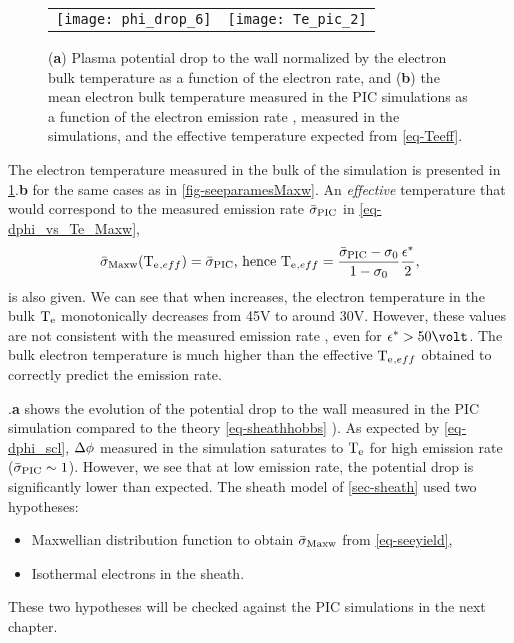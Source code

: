   \begin{figure}[hbt]
    \centering
    \begin{tabular}{@{} cc}
      \texttt{[image: phi\_drop\_6]}
      &
      \texttt{[image: Te\_pic\_2]}
    \end{tabular}
    \caption{({\bf a}) Plasma potential drop to the wall normalized by the electron bulk temperature as a function of the electron rate, and ({\bf b}) the mean electron bulk temperature measured in the \acs{PIC} simulations as a function of the electron emission rate \rate, measured in the simulations, and the effective temperature expected from \cref{eq-Teeff}.  }
    \label{fig-Tevsproba}
  \end{figure}
  
  The electron temperature measured in the bulk of the simulation is presented in \cref{fig-Tevsproba}.{\bf b} for the same cases as in \cref{fig-seeparamesMaxw}.
  An \emph{effective} temperature that would correspond to the measured emission rate $ \bar{\sigma }_{\rm PIC}$ in \cref{eq-dphi_vs_Te_Maxw},
  \begin{equation} \label{eq-Teeff}
      \bar{\sigma }_{\rm Maxw}(\mathrm{T_e}{}_{, eff}) =  \bar{\sigma }_{\rm PIC} \text{, hence } \mathrm{T_e}{}_{, eff} = \frac{ \bar{\sigma }_{\rm PIC} - \sigma_0}{1 - \sigma_0} \frac{\epsilon^{*}}{2},
  \end{equation}
  is also given.
  We can see that when \rate increases, the electron temperature in the bulk $\mathrm{T_e}$ monotonically decreases from 45V to around 30V.
  However, these values are not consistent with the measured emission rate \ratepic, even for $\crover > 50\volt$.
  The bulk electron temperature is much higher than the effective $\mathrm{T_e}{}_{, eff}$ obtained to correctly predict the emission rate.

  .{\bf a} shows the evolution of the potential drop to the wall measured in the \ac{PIC} simulation compared to the theory  \cref{eq-sheathhobbs} ).
  As expected by \cref{eq-dphi_scl}, $\Delta \phi$ measured in the simulation saturates to $\mathrm{T_e}$ for high emission rate ($ \bar{\sigma }_{\rm PIC} \sim 1$).
  However, we see that at low emission rate, the potential drop is significantly lower than expected.
  The sheath model of \cref{sec-sheath} used two hypotheses\string:
  \begin{itemize}
    \item Maxwellian distribution function to obtain $ \bar{\sigma }_{\rm Maxw}$ from \cref{eq-seeyield},
    \item Isothermal electrons in the sheath.
  \end{itemize}
  These two hypotheses will be checked against the PIC simulations in the next chapter.
